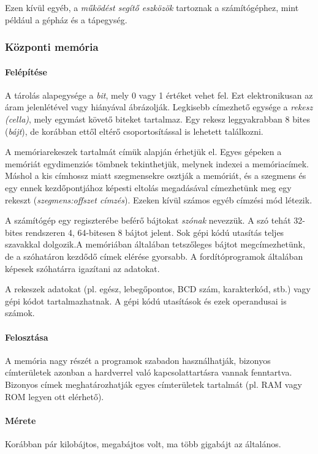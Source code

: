 \documentclass[a4paper]{article}
\begin{document}
Ezen kívül egyéb, a \emph{működést segítő eszközök} tartoznak a számítógéphez, mint például a gépház és a tápegység.

\subsubsection{Központi memória}

\paragraph{Felépítése} A tárolás alapegysége a \emph{bit}, mely 0 vagy 1 értéket vehet fel. Ezt elektronikusan az áram jelenlétével vagy hiányával ábrázolják. Legkisebb címezhető egysége a \emph{rekesz (cella)}, mely egymást követő biteket tartalmaz. Egy rekesz leggyakrabban 8 bites (\emph{bájt}), de korábban ettől eltérő csoportosítással is lehetett találkozni.

A memóriarekeszek tartalmát címük alapján érhetjük el. Egyes gépeken a memóriát egydimenziós tömbnek tekinthetjük, melynek indexei a memóriacímek. Máshol a kis címhossz miatt szegmensekre osztják a memóriát, és a szegmens és egy ennek kezdőpontjához képesti eltolás megadásával címezhetünk meg egy rekeszt (\emph{szegmens:offszet címzés}). Ezeken kívül számos egyéb címzési mód létezik.

A számítógép egy regiszterébe beférő bájtokat \emph{szónak} nevezzük. A szó tehát 32-bites rendszeren 4, 64-bitesen 8 bájtot jelent. Sok gépi kódú utasítás teljes szavakkal dolgozik.A memóriában általában tetszőleges bájtot megcímezhetünk, de a szóhatáron kezdődő címek elérése gyorsabb. A fordítóprogramok általában képesek szóhatárra igazítani az adatokat.

A rekeszek adatokat (pl. egész, lebegőpontos, BCD szám, karakterkód, stb.) vagy gépi kódot tartalmazhatnak. A gépi kódú utasítások és ezek operandusai is számok.

\paragraph{Felosztása} A memória nagy részét a programok szabadon használhatják, bizonyos címterületek azonban a hardverrel való kapcsolattartásra vannak fenntartva. Bizonyos címek meghatározhatják egyes címterületek tartalmát (pl. RAM vagy ROM legyen ott elérhető).

\paragraph{Mérete} Korábban pár kilobájtos, megabájtos volt, ma több gigabájt az általános.
\end{document}
